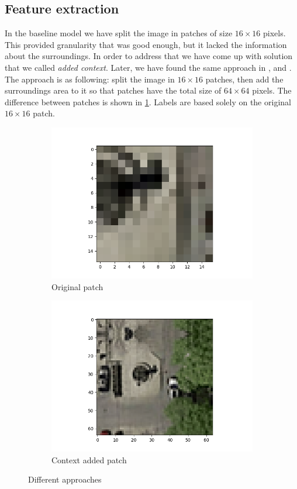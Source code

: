 \documentclass[10pt,conference,compsocconf]{IEEEtran}
\begin{document}
\subsection{Feature extraction}
\label{sec:feature}
In the baseline model we have split the image in patches of size $16\times16$ pixels. This provided granularity
that was good enough, but it lacked the information about the surroundings. In order to address that we have come up
with solution that we called \textit{added context}. Later, we have found the same approach in \cite{mthesis},
\cite{Mnih2010} and \cite{eth_paper}. The approach is as following: split the image in $16\times16$ patches, then add the 
surroundings area to it so that patches have the total size of $64\times64$ pixels. The difference between patches is
shown in \ref{fig:patches}. Labels are based solely on the original $16\times16$ patch. 

\begin{figure}
\centering
\begin{subfigure}{.5\columnwidth}
  \centering
  \includegraphics[width=.8\linewidth]{orig_patch.png}
  \caption{Original patch}
\end{subfigure}%
\begin{subfigure}{.5\columnwidth}
  \centering
  \includegraphics[width=\linewidth]{cont_added_patch.png}
  \caption{Context added patch}
\end{subfigure}
\caption{Different approaches}
\label{fig:patches}
\end{figure}
\end{document}
